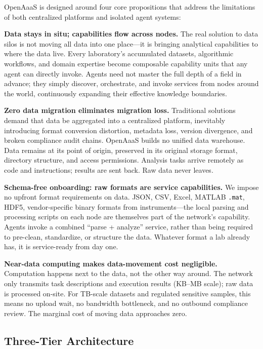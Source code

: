 \documentclass{article}
\begin{document}
OpenAaaS is designed around four core propositions that address the limitations of both centralized platforms and isolated agent systems:

\textbf{Data stays in situ; capabilities flow across nodes.} The real solution to data silos is not moving all data into one place---it is bringing analytical capabilities to where the data live. Every laboratory's accumulated datasets, algorithmic workflows, and domain expertise become composable capability units that any agent can directly invoke. Agents need not master the full depth of a field in advance; they simply discover, orchestrate, and invoke services from nodes around the world, continuously expanding their effective knowledge boundaries.

\textbf{Zero data migration eliminates migration loss.} Traditional solutions demand that data be aggregated into a centralized platform, inevitably introducing format conversion distortion, metadata loss, version divergence, and broken compliance audit chains. OpenAaaS builds no unified data warehouse. Data remains at its point of origin, preserved in its original storage format, directory structure, and access permissions. Analysis tasks arrive remotely as code and instructions; results are sent back. Raw data never leaves.

\textbf{Schema-free onboarding: raw formats are service capabilities.} We impose no upfront format requirements on data. JSON, CSV, Excel, MATLAB \texttt{.mat}, HDF5, vendor-specific binary formats from instruments---the local parsing and processing scripts on each node are themselves part of the network's capability. Agents invoke a combined ``parse + analyze'' service, rather than being required to pre-clean, standardize, or structure the data. Whatever format a lab already has, it is service-ready from day one.

\textbf{Near-data computing makes data-movement cost negligible.} Computation happens next to the data, not the other way around. The network only transmits task descriptions and execution results (KB--MB scale); raw data is processed on-site. For TB-scale datasets and regulated sensitive samples, this means no upload wait, no bandwidth bottleneck, and no outbound compliance review. The marginal cost of moving data approaches zero.

\subsection{Three-Tier Architecture}
\end{document}
